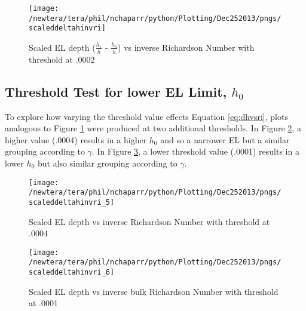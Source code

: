 \begin{figure}[htbp]
\centering
 \texttt{[image: /newtera/tera/phil/nchaparr/python/Plotting/Dec252013/pngs/scaleddeltahinvri]}
       
        \caption{Scaled EL depth ($\frac{h_{1}}{h}$ - $\frac{h_{0}}{h}$) vs inverse Richardson Number with threshold at .0002}
         \label{fig:scaledeltahinvri}
\end{figure}

\clearpage
\subsection{Threshold Test for lower \acs{EL} Limit, $h_{0}$}
To explore how varying the threshold value effects Equation \ref{eq:dhvsri}, plots analogous to Figure \ref{fig:scaledeltahinvri} were produced at two 
additional thresholds.  In Figure \ref{fig:scaledeltahinvri1}, a higher value (.0004) results in a higher $h_{0}$   
and so a narrower \acs{EL} but a similar grouping according to $\gamma$.
In Figure \ref{fig:scaledeltahinvri2}, a lower threshold value (.0001) results in a lower $h_{0}$
but also similar grouping according to $\gamma$.\\

\begin{figure}[htbp]
    \centering
    \texttt{[image: /newtera/tera/phil/nchaparr/python/Plotting/Dec252013/pngs/scaleddeltahinvri\_5]}
    \caption{Scaled EL depth vs inverse Richardson Number with threshold at .0004}
    \label{fig:scaledeltahinvri1}   %
\end{figure}

\begin{figure}[htbp]
    \centering
    \texttt{[image: /newtera/tera/phil/nchaparr/python/Plotting/Dec252013/pngs/scaleddeltahinvri\_6]}
    \caption{Scaled EL depth vs inverse bulk Richardson Number with threshold at .0001}
    \label{fig:scaledeltahinvri2}   %
\end{figure}

